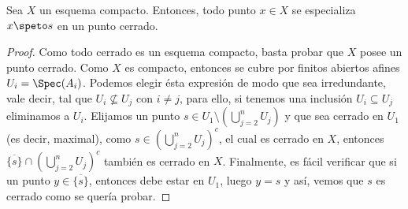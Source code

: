 \begin{prop}\label{thm:qc_sch_many_closed_pts}
	Sea $X$ un esquema compacto.
	Entonces, todo punto $x \in X$ se especializa $x \speto s$ en un punto cerrado.
\end{prop}
\begin{proof}
	Como todo cerrado es un esquema compacto, basta probar que $X$ posee un punto cerrado.
	Como $X$ es compacto, entonces se cubre por finitos abiertos afines $U_i = \Spec(A_i)$.
	Podemos elegir ésta expresión de modo que sea irredundante, vale decir, tal que $U_i \nsubseteq U_j$ con $i \ne j$,
	para ello, si tenemos una inclusión $U_i \subseteq U_j$ eliminamos a $U_i$.
	Elijamos un punto $s \in U_1 \setminus \left( \bigcup_{j=2}^n U_j \right)$ y que sea cerrado en $U_1$ (es decir, maximal),
	como $s \in \left( \bigcup_{j=2}^n U_j \right)^c$, el cual es cerrado en $X$, entonces $ \overline{\{ s \}} \cap \left( \bigcup_{j=2}^{n} U_j \right)^c$
	también es cerrado en $X$.
	Finalmente, es fácil verificar que si un punto $y \in \overline{\{ s \}}$, entonces debe estar en $U_1$,
	luego $y = s$ y así, vemos que $s$ es cerrado como se quería probar.

\end{proof}
